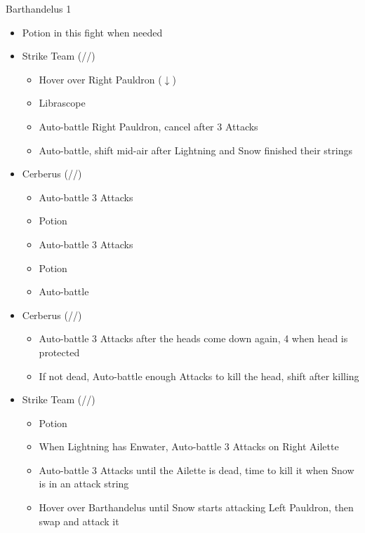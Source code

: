 \renewcommand{\first}{[1] Strike Team (\com/\syn/\com)}
\renewcommand{\second}{[2] Tri-Disaster (\rav/\rav/\rav)}
\renewcommand{\third}{[3] Tri-Disaster (\rav/\rav/\rav)}
\renewcommand{\fourth}{[4] Cerberus (\com/\com/\com)}
\renewcommand{\fifth}{[5] Cerberus (\com/\com/\com)}
\begin{battle}[2:15]{Barthandelus 1}
		\begin{itemize}
			\item Potion in this fight when needed
			\item \first
			      \begin{itemize}
				      \item Hover over Right Pauldron ($\downarrow$)
				      \item Librascope
				      \item Auto-battle Right Pauldron, cancel after 3 Attacks
				      \item Auto-battle, shift mid-air after Lightning and Snow finished their strings
			      \end{itemize}
			\item \fifth
			      \begin{itemize}
				      \item Auto-battle 3 Attacks
				      \item Potion
				      \item Auto-battle 3 Attacks
				      \item Potion
				      \item Auto-battle
			      \end{itemize}
			\item \fourth
			      \begin{itemize}
				      \item Auto-battle 3 Attacks after the heads come down again, 4 when head is protected
                                                 \item If not dead, Auto-battle enough Attacks to kill the head, shift after killing
			      \end{itemize}
			\item \first
			      \begin{itemize}
				      \item Potion
				      \item When Lightning has Enwater, Auto-battle 3 Attacks on Right Ailette
				      \item Auto-battle 3 Attacks until the Ailette is dead, time to kill it when Snow is in an attack string
				      \item Hover over Barthandelus until Snow starts attacking Left Pauldron, then swap and attack it

\end{itemize}
\end{itemize}
\end{battle}
